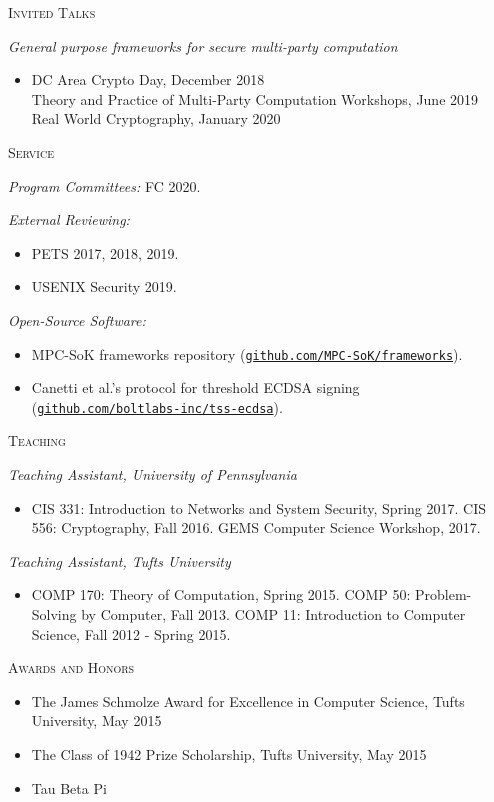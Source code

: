 \documentclass{article}
\begin{document}
\textsc{Invited Talks}

\emph{General purpose frameworks for secure multi-party computation}
\begin{itemize}[label={}, topsep=0pt]
\item DC Area Crypto Day, December 2018 \\
  Theory and Practice of Multi-Party Computation Workshops, June 2019 \\
  Real World Cryptography, January 2020\\
\end{itemize}

\textsc{Service}

\textit{Program Committees:} FC 2020.

\textit{External Reviewing:} 
\begin{itemize}[label={}, noitemsep, topsep=0pt]
\item PETS 2017, 2018, 2019. \item USENIX Security 2019.
\end{itemize}

\textit{Open-Source Software:} 
\begin{itemize}[label={}, noitemsep, topsep=0pt]
    \item MPC-SoK frameworks repository (\href{https://github.com/MPC-SoK/frameworks}{\texttt{github.com/MPC-SoK/frameworks}}).
    \item Canetti et al.'s protocol for threshold ECDSA signing (\href{https://github.com/boltlabs-inc/tss-ecdsa}{\texttt{github.com/boltlabs-inc/tss-ecdsa}}).\\
\end{itemize}

\textsc{Teaching}

\textit{Teaching Assistant, University of Pennsylvania} 
\begin{itemize}[label={}, noitemsep, topsep=0pt]
\item CIS 331: Introduction to Networks and System Security, Spring 2017.
CIS 556: Cryptography, Fall 2016.
GEMS Computer Science Workshop, 2017.
\end{itemize}

\textit{Teaching Assistant, Tufts University} 
\begin{itemize}[label={}, noitemsep, topsep=0pt]
\item COMP 170: Theory of Computation, Spring 2015.
COMP 50: Problem-Solving by Computer, Fall 2013.
COMP 11: Introduction to Computer Science, Fall 2012 - Spring 2015. \\
\end{itemize}

\textsc{Awards and Honors}
\begin{itemize}[label={},noitemsep]
\item The James Schmolze Award for Excellence in Computer Science, Tufts University, May 2015
\item The Class of 1942 Prize Scholarship, Tufts University, May 2015
\item Tau Beta Pi
\end{itemize}
\end{document}
